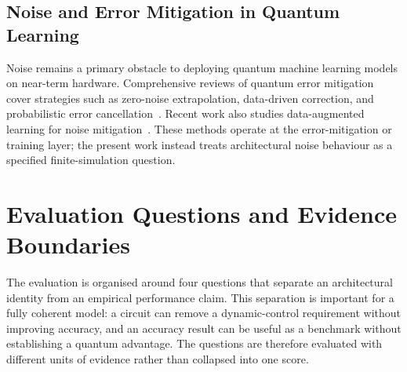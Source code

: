 \documentclass[conference]{IEEEtran}
\begin{document}
\subsection{Noise and Error Mitigation in Quantum Learning}
Noise remains a primary obstacle to deploying quantum machine learning models on near-term hardware. Comprehensive reviews of quantum error mitigation cover strategies such as zero-noise extrapolation, data-driven correction, and probabilistic error cancellation~\cite{ref22}. Recent work also studies data-augmented learning for noise mitigation~\cite{ref16}. These methods operate at the error-mitigation or training layer; the present work instead treats architectural noise behaviour as a specified finite-simulation question.

\section{Evaluation Questions and Evidence Boundaries}
The evaluation is organised around four questions that separate an
architectural identity from an empirical performance claim. This separation is
important for a fully coherent model: a circuit can remove a dynamic-control
requirement without improving accuracy, and an accuracy result can be useful as
a benchmark without establishing a quantum advantage. The questions are
therefore evaluated with different units of evidence rather than collapsed into
one score.
\end{document}
